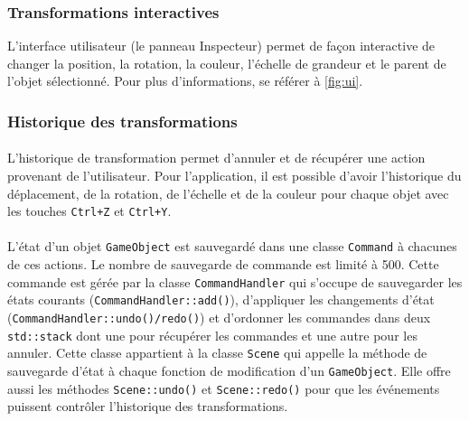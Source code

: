 \subsubsection{Transformations interactives}
L’interface utilisateur (le panneau Inspecteur) permet de façon interactive de changer la position, la rotation, la couleur, l’échelle de grandeur et le parent de l’objet sélectionné. Pour plus d’informations, se référer à \ref{fig:ui}.

\subsubsection{Historique des transformations}
\paragraph{} L'historique de transformation permet d'annuler et de récupérer une action provenant de l'utilisateur. Pour l'application, il est possible d'avoir l'historique du déplacement, de la rotation, de l'échelle et de la couleur pour chaque objet avec les touches \texttt{Ctrl+Z} et \texttt{Ctrl+Y}.
\paragraph{} L'état d'un objet \texttt{GameObject} est sauvegardé dans une classe \texttt{Command} à chacunes de ces actions. Le nombre de sauvegarde de commande est limité à 500. Cette commande est gérée par la classe \texttt{CommandHandler} qui s'occupe de sauvegarder les états courants (\texttt{CommandHandler::add()}), d'appliquer les changements d'état (\texttt{CommandHandler::undo()/redo()}) et d'ordonner les commandes dans deux \texttt{std::stack} dont une pour récupérer les commandes et une autre pour les annuler. Cette classe appartient à la classe \texttt{Scene} qui appelle la méthode de sauvegarde d'état à chaque fonction de modification d'un \texttt{GameObject}. Elle offre aussi les méthodes \texttt{Scene::undo()} et \texttt{Scene::redo()} pour que les événements puissent contrôler l'historique des transformations.

